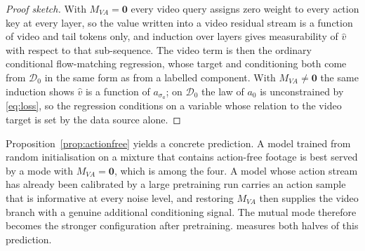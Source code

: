 \begin{proof}[Proof sketch]
With $M_{VA} = \mathbf{0}$ every video query assigns zero weight to every action
key at every layer, so the value written into a video residual stream is a
function of video and tail tokens only, and induction over layers gives
measurability of $\hat{v}$ with respect to that sub-sequence. The video term is
then the ordinary conditional flow-matching regression, whose target and
conditioning both come from $\mathcal{D}_0$ in the same form as from a labelled
component. With $M_{VA} \neq \mathbf{0}$ the same induction shows $\hat{v}$ is a
function of $a_{\sigma_a}$; on $\mathcal{D}_0$ the law of $a_0$ is unconstrained
by \eqref{eq:loss}, so the regression conditions on a variable whose relation to
the video target is set by the data source alone.
\end{proof}

Proposition~\ref{prop:actionfree} yields a concrete prediction. A model trained from
random initialisation on a mixture that contains action-free footage is best
served by a mode with $M_{VA} = \mathbf{0}$, which is \AV{} among the four. A
model whose action stream has already been calibrated by a large pretraining run
carries an action sample that is informative at every noise level, and restoring
$M_{VA}$ then supplies the video branch with a genuine additional conditioning
signal. The mutual mode \VAV{} therefore becomes the stronger configuration
after pretraining.  measures both halves of this prediction.

